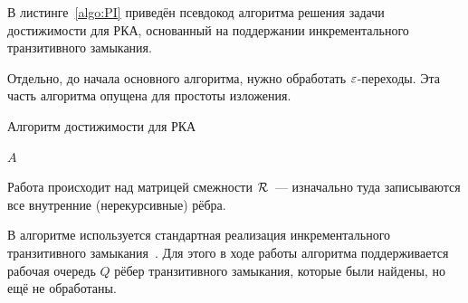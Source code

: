 \begin{definition}
  \TODO
\end{definition}

В листинге~\ref{algo:PI} приведён псевдокод алгоритма решения задачи достижимости для РКА, основанный на поддержании инкрементального транзитивного замыкания.

\begin{note}
  Отдельно, до начала основного алгоритма, нужно обработать $\varepsilon$-переходы. Эта часть алгоритма опущена для простоты изложения. 
\end{note}

\begin{algorithm}[H]
    \begin{algorithmic}[1]
    \caption{Алгоритм достижимости для РКА}
    \label{algo:PI}
            \EndFor
        \EndFor
            \EndIf
                        \EndIf
                    \EndFor
                \EndIf
            \EndFor
        \EndWhile
    \State \Return $A$
    \EndFunction
    \end{algorithmic}
\end{algorithm}

Работа происходит над матрицей смежности $\mathcal{R}$~--- изначально туда записываются все внутренние (нерекурсивные) рёбра. 

В алгоритме используется стандартная реализация инкрементального транзитивного замыкания~\cite{Ibaraki1983}. Для этого в ходе работы алгоритма поддерживается рабочая очередь $Q$ рёбер транзитивного замыкания, которые были найдены, но ещё не обработаны. 

